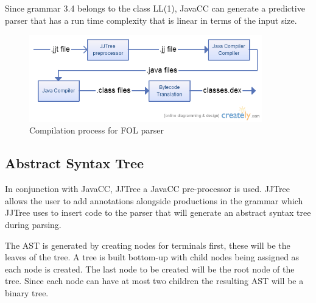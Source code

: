 Since grammar 3.4 belongs to the class LL(1), JavaCC can generate a predictive parser that has a run time complexity that is linear in terms of the input size.  

\begin{figure}[h]
\centering
\includegraphics[width=0.9\textwidth]{Images/compilation.png}
\caption{Compilation process for FOL parser}
\label{fig:Compilation}
\end{figure}

\subsection{Abstract Syntax Tree}

In conjunction with JavaCC,  JJTree a JavaCC pre-processor is used. JJTree allows the user to add annotations alongside productions in the grammar which JJTree uses to insert code to the parser that will generate an abstract syntax tree during parsing. 

The AST is generated by creating nodes for terminals first, these will be the leaves of the tree. A tree is built bottom-up with child nodes being assigned as each node is created. The last node to be created will be the root node of the tree. Since each node can have at most two children the resulting AST will be a binary tree.

